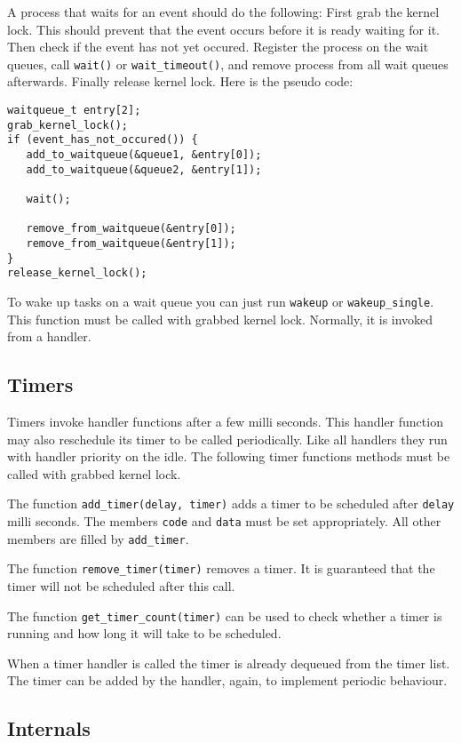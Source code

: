 \documentclass[twocolumn]{article}
\begin{document}
  A process that waits for an event should do the following: First grab
  the kernel lock. This should prevent that the event occurs before it is
  ready waiting for it.  Then check if the event has not yet occured.  
  Register the process on the wait queues, call \verb|wait()| or
  \verb|wait_timeout()|, and remove process from all wait queues afterwards.
  Finally release kernel lock.  Here is the pseudo code:

  \begin{verbatim}
waitqueue_t entry[2];
grab_kernel_lock();
if (event_has_not_occured()) {
   add_to_waitqueue(&queue1, &entry[0]);
   add_to_waitqueue(&queue2, &entry[1]);

   wait();

   remove_from_waitqueue(&entry[0]);
   remove_from_waitqueue(&entry[1]);
}
release_kernel_lock();
\end{verbatim}

  To wake up tasks on a wait queue you can just run \verb|wakeup| or
  \verb|wakeup_single|.  This function must be called with grabbed kernel
  lock.  Normally, it is invoked from a handler.

  \subsection{Timers}
  
  Timers invoke handler functions after a few milli seconds.  This handler
  function may also reschedule its timer to be called periodically.  Like all
  handlers they run with handler priority on the idle. The following timer
  functions methods must be called with grabbed kernel lock.

  The function \verb|add_timer(delay, timer)| adds a timer to be scheduled
  after \verb|delay| milli seconds.  The members \verb|code| and \verb|data|
  must be set appropriately.  All other members are filled by
  \verb|add_timer|.
  
  The function \verb|remove_timer(timer)| removes a timer.  It is guaranteed
  that the timer will not be scheduled after this call.

  The function \verb|get_timer_count(timer)| can be used to check whether a
  timer is running and how long it will take to be scheduled.

  When a timer handler is called the timer is already dequeued from the timer
  list.  The timer can be added by the handler, again, to implement periodic
  behaviour.


  \subsection{Internals}
\end{document}
